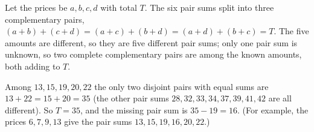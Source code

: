 Let the prices be $a,b,c,d$ with total $T$. The six pair sums split into three complementary pairs, $(a+b)+(c+d)=(a+c)+(b+d)=(a+d)+(b+c)=T$. The five amounts are different, so they are five different pair sums; only one pair sum is unknown, so two complete complementary pairs are among the known amounts, both adding to $T$.

Among $13,15,19,20,22$ the only two disjoint pairs with equal sums are $13+22=15+20=35$ (the other pair sums $28,32,33,34,37,39,41,42$ are all different). So $T=\boxed{35}$, and the missing pair sum is $35-19=16$. (For example, the prices $6,7,9,13$ give the pair sums $13,15,19,16,20,22$.)
